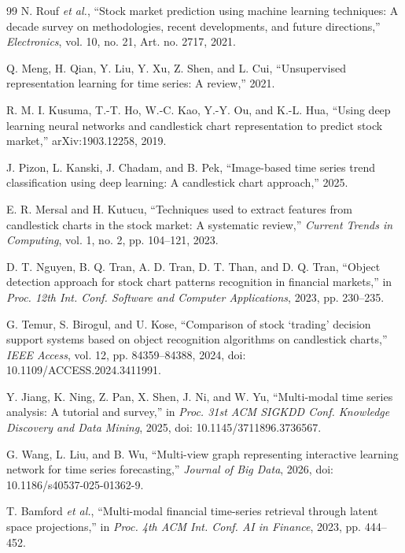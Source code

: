﻿\documentclass[conference]{IEEEtran}
\begin{document}
\FloatBarrier

\begin{thebibliography}{99}
\setlength{\itemsep}{0pt}
\setlength{\parskip}{0pt}
N. Rouf \emph{et al.}, ``Stock market prediction using machine learning techniques: A decade survey on methodologies, recent developments, and future directions,'' \emph{Electronics}, vol. 10, no. 21, Art. no. 2717, 2021.

Q. Meng, H. Qian, Y. Liu, Y. Xu, Z. Shen, and L. Cui, ``Unsupervised representation learning for time series: A review,'' 2021.

R. M. I. Kusuma, T.-T. Ho, W.-C. Kao, Y.-Y. Ou, and K.-L. Hua, ``Using deep learning neural networks and candlestick chart representation to predict stock market,'' arXiv:1903.12258, 2019.

J. Pizon, L. Kanski, J. Chadam, and B. Pek, ``Image-based time series trend classification using deep learning: A candlestick chart approach,'' 2025.

E. R. Mersal and H. Kutucu, ``Techniques used to extract features from candlestick charts in the stock market: A systematic review,'' \emph{Current Trends in Computing}, vol. 1, no. 2, pp. 104--121, 2023.

D. T. Nguyen, B. Q. Tran, A. D. Tran, D. T. Than, and D. Q. Tran, ``Object detection approach for stock chart patterns recognition in financial markets,'' in \emph{Proc. 12th Int. Conf. Software and Computer Applications}, 2023, pp. 230--235.

G. Temur, S. Birogul, and U. Kose, ``Comparison of stock `trading' decision support systems based on object recognition algorithms on candlestick charts,'' \emph{IEEE Access}, vol. 12, pp. 84359--84388, 2024, doi: 10.1109/ACCESS.2024.3411991.

Y. Jiang, K. Ning, Z. Pan, X. Shen, J. Ni, and W. Yu, ``Multi-modal time series analysis: A tutorial and survey,'' in \emph{Proc. 31st ACM SIGKDD Conf. Knowledge Discovery and Data Mining}, 2025, doi: 10.1145/3711896.3736567.

G. Wang, L. Liu, and B. Wu, ``Multi-view graph representing interactive learning network for time series forecasting,'' \emph{Journal of Big Data}, 2026, doi: 10.1186/s40537-025-01362-9.

T. Bamford \emph{et al.}, ``Multi-modal financial time-series retrieval through latent space projections,'' in \emph{Proc. 4th ACM Int. Conf. AI in Finance}, 2023, pp. 444--452.


\end{thebibliography}
\end{document}
